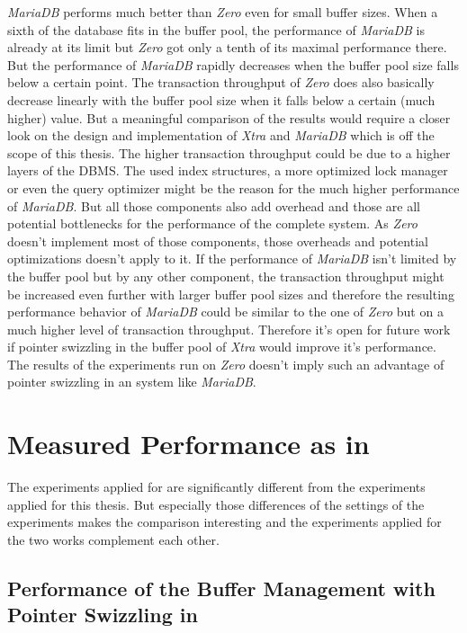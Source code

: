 	\emph{MariaDB} performs much better than \emph{Zero} even for small buffer sizes. When a sixth of the database fits in the buffer pool, the performance of \emph{MariaDB} is already at its limit but \emph{Zero} got only a tenth of its maximal performance there. But the performance of \emph{MariaDB} rapidly decreases when the buffer pool size falls below a certain point. The transaction throughput of \emph{Zero} does also basically decrease linearly with the buffer pool size when it falls below a certain (much higher) value. But a meaningful comparison of the results would require a closer look on the design and implementation of \emph{Xtra} and \emph{MariaDB} which is off the scope of this thesis. The higher transaction throughput could be due to a higher layers of the DBMS. The used index structures, a more optimized lock manager or even the query optimizer might be the reason for the much higher performance of \emph{MariaDB}. But all those components also add overhead and those are all potential bottlenecks for the performance of the complete system. As \emph{Zero} doesn't implement most of those components, those overheads and potential optimizations doesn't apply to it. If the performance of \emph{MariaDB} isn't limited by the buffer pool but by any other component, the transaction throughput might be increased even further with larger buffer pool sizes and therefore the resulting performance behavior of \emph{MariaDB} could be similar to the one of \emph{Zero} but on a much higher level of transaction throughput. Therefore it's open for future work if pointer swizzling in the buffer pool of \emph{Xtra} would improve it's performance. The results of the experiments run on \emph{Zero} doesn't imply such an advantage of pointer swizzling in an system like \emph{MariaDB}.

\section{Measured Performance as in \cite{Graefe:2014}}

	The experiments applied for \cite{Graefe:2014} are significantly different from the experiments applied for this thesis. But especially those differences of the settings of the experiments makes the comparison interesting and the experiments applied for the two works complement each other.
	
\subsection{Performance of the Buffer Management with Pointer Swizzling in \cite{Graefe:2014}}

